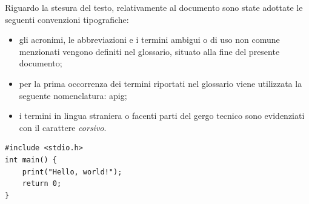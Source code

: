 Riguardo la stesura del testo, relativamente al documento sono state adottate le seguenti convenzioni tipografiche:
\begin{itemize}
	\item gli acronimi, le abbreviazioni e i termini ambigui o di uso non comune menzionati vengono definiti nel glossario, situato alla fine del presente documento;
	\item per la prima occorrenza dei termini riportati nel glossario viene utilizzata la seguente nomenclatura: \gls{apig};
	\item i termini in lingua straniera o facenti parti del gergo tecnico sono evidenziati con il carattere \textit{corsivo}.
\end{itemize}

\begin{listing}[H]
\begin{verbatim}
#include <stdio.h>
int main() {
    print("Hello, world!");
    return 0;
}
\end{verbatim}
\caption{Esempio di codice}
\label{listing:a}
\end{listing}
